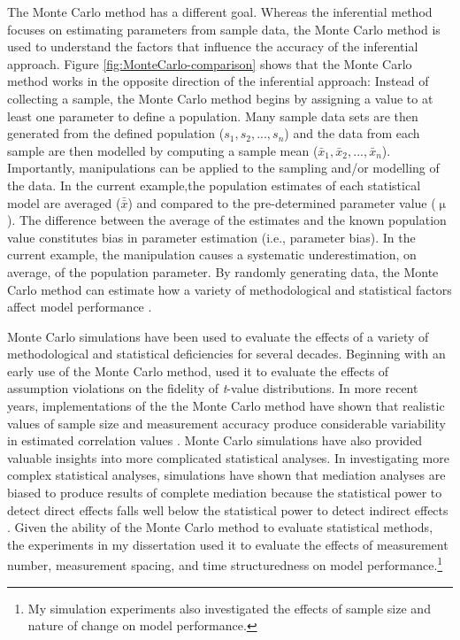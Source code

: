 \documentclass[
12pt, %
twoside,
english]{guelphthesis}
\begin{document}
The Monte Carlo method has a different goal. Whereas the inferential method focuses on estimating parameters from sample data, the Monte Carlo method is used to understand the factors that influence the accuracy of the inferential approach. Figure \ref{fig:MonteCarlo-comparison} shows that the Monte Carlo method works in the opposite direction of the inferential approach: Instead of collecting a sample, the Monte Carlo method begins by assigning a value to at least one parameter to define a population. Many sample data sets are then generated from the defined population (\(s_1, s_2, ..., s_n\)) and the data from each sample are then modelled by computing a sample mean (\(\bar{x}_1, \bar{x}_2, ..., \bar{x}_n\)). Importantly, manipulations can be applied to the sampling and/or modelling of the data. In the current example,the population estimates of each statistical model are averaged (\(\bar{\bar{x}}\)) and compared to the pre-determined parameter value (\(\upmu\)). The difference between the average of the estimates and the known population value constitutes bias in parameter estimation (i.e., parameter bias). In the current example, the manipulation causes a systematic underestimation, on average, of the population parameter. By randomly generating data, the Monte Carlo method can estimate how a variety of methodological and statistical factors affect model performance \autocite[for a review, see][]{robert2010}.

Monte Carlo simulations have been used to evaluate the effects of a variety of methodological and statistical deficiencies for several decades. Beginning with an early use of the Monte Carlo method, \textcite{boneau1960} used it to evaluate the effects of assumption violations on the fidelity of \emph{t}-value distributions. In more recent years, implementations of the the Monte Carlo method have shown that realistic values of sample size
and measurement accuracy produce considerable variability in estimated correlation values \autocite{stanley2014}. Monte Carlo simulations have also provided valuable insights into more complicated statistical analyses. In investigating more complex statistical analyses, simulations have shown that mediation analyses are biased to produce results of complete mediation because the statistical power to detect direct effects falls well below the statistical power to detect indirect effects \autocite{kenny2014}. Given the ability of the Monte Carlo method to evaluate statistical methods, the experiments in my dissertation used it to evaluate the effects of measurement number, measurement spacing, and time structuredness on model performance.\footnote{My simulation experiments also investigated the effects of sample size and nature of change on model performance.}
\end{document}
